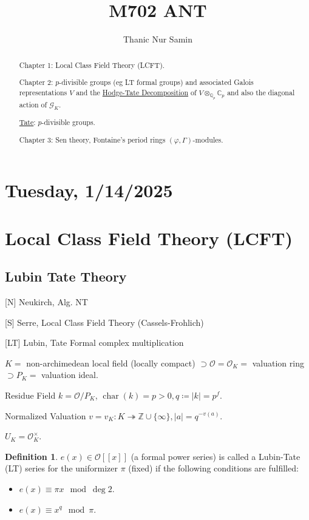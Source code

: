 \documentclass{article}
\title{M702 ANT}
\author{Thanic Nur Samin}
\date{\vspace{-5ex}}
\theoremstyle{definition}
\newtheorem*{definition}{Definition}
\numberwithin{theorem}{subsection}
\begin{document}
    \maketitle

    \section*{Tuesday, 1/14/2025}

    \begin{abstract}
        Chapter 1: Local Class Field Theory (LCFT).

        Chapter 2: \(p\)-divisible groups (eg LT formal groups) and associated Galois representations \(V\) and the \underline{Hodge-Tate Decomposition} of \(V \otimes_{\mathbb{Q}_p}\mathbb{C}_p\) and also the diagonal action of \(\mathscr{G}_K\).

        \underline{Tate}: \(p\)-divisible groups.

        Chapter 3: Sen theory, Fontaine's period rings \((\varphi, \Gamma)\)-modules.


    \end{abstract}
    
    \section{Local Class Field Theory (LCFT)}

    \subsection{Lubin Tate Theory}

    [N] Neukirch, Alg. NT
    
    [S] Serre, Local Class Field Theory (Cassels-Frohlich)

    [LT] Lubin, Tate Formal complex multiplication

    \(K =\)  non-archimedean local field (locally compact) \(\supset \mathcal{O} = \mathcal{O}_K =\) valuation ring \(\supset P_K =\) valuation ideal.

    Residue Field \(k = \mathcal{O} / P_K\), \(\operatorname{char} (k) = p > 0, q \coloneqq \vert k \vert = p^f\).

    Normalized Valuation \(v = v_K : K \twoheadrightarrow \mathbb{Z} \cup \{ \infty \}, \vert a \vert = q^{-v(a)}\).
    
    \(U_K = \mathcal{O}_K^\times\).

    \begin{definition}
        \(e(x) \in \mathcal{O} [[x]]\) (a formal power series) is called a Lubin-Tate (LT) series for the uniformizer \(\pi\) (fixed) if the following conditions are fulfilled:

        \begin{itemize}
            \item \(e(x) \equiv \pi x \mod\deg 2\).
            \item \(e(x) \equiv x^q \mod \pi\). 
        \end{itemize} 
    \end{definition}
\end{document}

